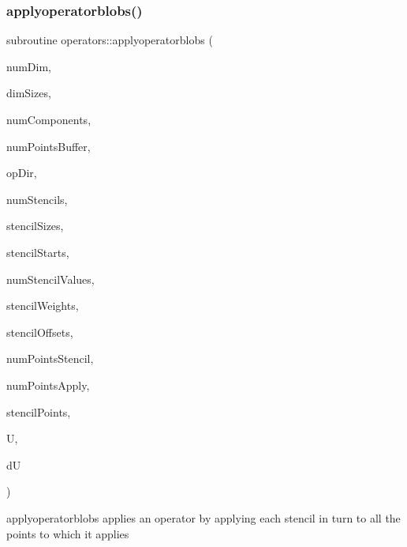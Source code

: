 \subsubsection{\texorpdfstring{applyoperatorblobs()}{applyoperatorblobs()}}
{\footnotesize\ttfamily subroutine operators\+::applyoperatorblobs (\begin{DoxyParamCaption}\item[{integer(kind=4), intent(in)}]{num\+Dim,  }\item[{integer(kind=8), dimension(numdim), intent(in)}]{dim\+Sizes,  }\item[{integer(kind=4), intent(in)}]{num\+Components,  }\item[{integer(kind=8), intent(in)}]{num\+Points\+Buffer,  }\item[{integer(kind=4), intent(in)}]{op\+Dir,  }\item[{integer(kind=4), intent(in)}]{num\+Stencils,  }\item[{integer(kind=4), dimension(numstencils), intent(in)}]{stencil\+Sizes,  }\item[{integer(kind=4), dimension(numstencils), intent(in)}]{stencil\+Starts,  }\item[{integer(kind=4), intent(in)}]{num\+Stencil\+Values,  }\item[{real(kind=8), dimension(numstencilvalues), intent(in)}]{stencil\+Weights,  }\item[{integer(kind=4), dimension(numstencilvalues), intent(in)}]{stencil\+Offsets,  }\item[{integer(kind=8), dimension(numstencils), intent(in)}]{num\+Points\+Stencil,  }\item[{integer(kind=8), intent(in)}]{num\+Points\+Apply,  }\item[{integer(kind=8), dimension(numpointsapply), intent(in)}]{stencil\+Points,  }\item[{real(kind=8), dimension(numpointsbuffer), intent(in)}]{U,  }\item[{real(kind=8), dimension(numpointsbuffer), intent(out)}]{dU }\end{DoxyParamCaption})}



applyoperatorblobs applies an operator by applying each stencil in turn to all the points to which it applies 

